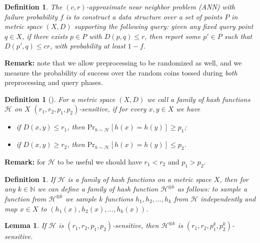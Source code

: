 \documentclass[11pt,letterpaper]{article}
\newtheorem{lemma}[theorem]{Lemma}
\newtheorem{definition}[theorem]{Definition}
\newcommand{\Nbb}{\mathbb{N}}
\begin{document}
\begin{definition}
    The \emph{$(c, r)$-approximate near neighbor problem (ANN)} with failure
    probability $f$ is to construct a data structure over a set
    of points $P$ in metric space $(X, D)$ supporting the following
    query: given any fixed query point $q \in X$, if there exists
    $p \in P$ with $D(p, q) \leq r$, then report some $p' \in P$
    such that $D(p', q) \leq cr$, with probability at least $1 - f$.
\end{definition}
\textbf{Remark:} note that we allow preprocessing to be randomized as well,
and we measure the probability of success over the random coins tossed
during \emph{both} preprocessing and query phases.

\begin{definition}[\cite{him-anntr-12}]
    For a metric space $(X, D)$ we call a family of hash functions $\mathcal{H}$ on $X$ \emph{$(r_1, r_2, p_1, p_2)$-sensitive}, if
    for every $x, y \in X$ we have
    \begin{itemize}
        \item if $D(x, y) \leq r_1$, then $\mathrm{Pr}_{h \sim \mathcal{H}}[h(x) = h(y)] \geq p_1$;
        \item if $D(x, y) \geq r_2$, then $\mathrm{Pr}_{h \sim \mathcal{H}}[h(x) = h(y)] \leq p_2$.
    \end{itemize}
\end{definition}

\textbf{Remark:} for $\mathcal{H}$ to be useful we should have $r_1 < r_2$ and $p_1 > p_2$.

\begin{definition}
    If $\mathcal{H}$ is a family of hash functions on a metric space $X$, then for any $k \in \Nbb$ we can define a family of hash function
    $\mathcal{H}^{\otimes k}$ as follows: to sample a function from $\mathcal{H}^{\otimes k}$ we sample $k$ functions $h_1, h_2, \ldots, h_k$
    from $\mathcal{H}$ independently and map $x \in X$ to $(h_1(x), h_2(x), \ldots, h_k(x))$.
\end{definition}

\begin{lemma}
    If $\mathcal{H}$ is $(r_1, r_2, p_1, p_2)$-sensitive, then $\mathcal{H}^{\otimes k}$ is $(r_1, r_2, p_1^k, p_2^k)$-sensitive.
\end{lemma}
\end{document}

